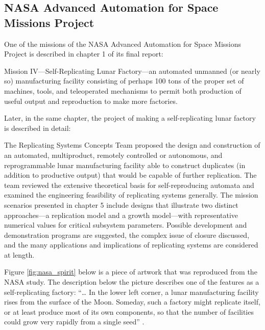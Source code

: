 \subsection[NASA Advanced Automation for Space Missions Project]{NASA
Advanced Automation for Space Missions Project}

One of the missions of the NASA Advanced Automation for Space Missions Project
is described in chapter 1 of its final report:

\begin{quoting}
Mission IV---Self-Replicating Lunar Factory---an
automated unmanned (or nearly so) manufacturing facility consisting of
perhaps 100 tons of the proper set of machines, tools, and teleoperated
mechanisms to permit both production of useful output and reproduction
to make more factories. \citep{freitasgilbreath1982}
\end{quoting}

Later, in the same chapter, the project of making a self-replicating lunar factory is described in detail:

\begin{quoting}
The
Replicating Systems Concepts Team proposed the design and construction
of an automated, multiproduct, remotely controlled or autonomous, and
reprogrammable lunar manufacturing facility able to construct
duplicates (in addition to productive output) that would be capable of
further replication. The team reviewed the extensive theoretical basis
for self-reproducing automata and examined the engineering feasibility
of replicating systems generally. The mission scenarios presented in
chapter 5 include designs that illustrate two distinct approaches---a
replication model and a growth model---with representative numerical
values for critical subsystem parameters. Possible development and
demonstration programs are suggested, the complex issue of closure
discussed, and the many applications and implications of replicating
systems are considered at length. \citep{freitasgilbreath1982}
\end{quoting}

Figure \ref{fig:nasa_spirit} below is a piece of artwork that was reproduced from the
NASA study.  The description below the picture describes one of the features as a
self-replicating factory: ``{\ldots} In the lower left corner, a lunar
manufacturing facility rises from the surface of the Moon. Someday,
such a factory might replicate itself, or at least produce most of its
own components, so that the number of facilities could grow very
rapidly from a single seed'' \citep{freitasgilbreath1982}.

